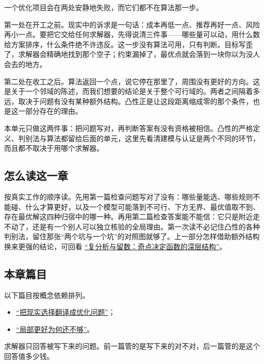 一个优化项目会在两处安静地失败，而它们都不在算法那一步。

第一处在开工之前。现实中的诉求是一句话：成本再低一点、推荐再好一点、风险再小一点。要把它交给任何求解器，先得说清三件事——哪些量可以动，用什么数给方案排序，什么条件绝不许违反。这一步没有算法可用，只有判断。目标写歪了，求解器会精确地找到那个空子；约束漏掉了，最优点就会落到一块你以为没人会去的地方。

第二处在收工之后。算法返回一个点，说它停在那里了，周围没有更好的方向。这是关于一个邻域的陈述，而我们想要的结论是关于整个可行域的。两者之间隔着多远，取决于问题有没有某种额外结构。凸性正是让这段距离缩成零的那个条件，也是这一部分存在的理由。

本单元只做这两件事：把问题写对，再判断答案有没有资格被相信。凸性的严格定义、判别法与算法都留给后面的单元，这里先看清建模与认证是两个不同的环节，而且都不取决于用哪个求解器。

\subsection{怎么读这一章}

按真实工作的顺序读。先用第一篇检查问题写对了没有：哪些量能选、哪些规则不能碰、什么才算更好，以及一个模型可能落到不可行、下方无界、最优值取不到、存在最优解这四种归宿中的哪一种。再用第二篇检查答案能不能信：它只是附近走不动了，还是有一个别人可以独立核验的全局理由。第一次读不必记住凸性的各种判别法，留住那张``两个坑与一个坑''的对照图就够了。上一部分怎样借助额外结构换来更强的结论，可回看 \hyperref[ch:069]{``复分析与留数：奇点决定函数的深层结构''}。

\subsection{本章篇目}

以下篇目按概念依赖排列。

\begin{itemize}
\tightlist
\item \hyperref[sec:09-Convex-Optimization/01-Optimization-Foundations/01]{``把现实选择翻译成优化问题''}；
\item \hyperref[sec:09-Convex-Optimization/01-Optimization-Foundations/02]{``局部更好为何还不够''}。
\end{itemize}

求解器只回答被写下来的问题。前一篇管的是写下来的对不对，后一篇管的是这个回答值多少钱。
